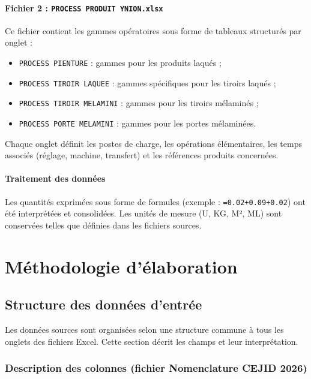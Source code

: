 \documentclass[12pt,a4paper]{article}
\begin{document}
\paragraph{Fichier 2 : \texttt{PROCESS PRODUIT YNION.xlsx}}
Ce fichier contient les gammes opératoires sous forme de tableaux structurés par onglet :
\begin{itemize}
    \item \texttt{PROCESS PIENTURE} : gammes pour les produits laqués ;
    \item \texttt{PROCESS TIROIR LAQUEE} : gammes spécifiques pour les tiroirs laqués ;
    \item \texttt{PROCESS TIROIR MELAMINI} : gammes pour les tiroirs mélaminés ;
    \item \texttt{PROCESS PORTE MELAMINI} : gammes pour les portes mélaminées.
\end{itemize}

Chaque onglet définit les postes de charge, les opérations élémentaires, les temps associés (réglage, machine, transfert) et les références produits concernées.

\paragraph{Traitement des données}
Les quantités exprimées sous forme de formules (exemple : \texttt{=0.02+0.09+0.02}) ont été interprétées et consolidées. Les unités de mesure (U, KG, M², ML) sont conservées telles que définies dans les fichiers sources.

\section{Méthodologie d'élaboration}

\subsection{Structure des données d'entrée}

Les données sources sont organisées selon une structure commune à tous les onglets des fichiers Excel. Cette section décrit les champs et leur interprétation.

\subsubsection{Description des colonnes (fichier Nomenclature CEJID 2026)}
\end{document}
